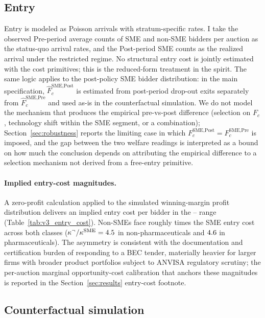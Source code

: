 \subsection{Entry}

Entry is modeled as Poisson arrivals with stratum-specific rates. I take the observed Pre-period average counts of SME and non-SME bidders per auction as the status-quo arrival rates, and the Post-period SME counts as the realized arrival under the restricted regime. No structural entry cost is jointly estimated with the cost primitives; this is the reduced-form treatment in the \citet{atheyseira2011} spirit. The same logic applies to the post-policy SME bidder distribution: in the main specification, $\hat F_c^{\text{SME,Post}}$ is estimated from post-period drop-out exits separately from $\hat F_c^{\text{SME,Pre}}$ and used as-is in the counterfactual simulation. We do not model the mechanism that produces the empirical pre-vs-post difference (selection on $F_c$, technology shift within the SME segment, or a combination); Section~\ref{sec:robustness} reports the limiting case in which $F_c^{\text{SME,Post}} = F_c^{\text{SME,Pre}}$ is imposed, and the gap between the two welfare readings is interpreted as a bound on how much the conclusion depends on attributing the empirical difference to a selection mechanism not derived from a free-entry primitive.

\paragraph{Implied entry-cost magnitudes.} A zero-profit calculation applied to the simulated winning-margin profit distribution delivers an implied entry cost per bidder in the \entryCostMin--\entryCostMax{} range (Table~\ref{tab:v3_entry_cost}). Non-SMEs face roughly \entryCostRatioNp{} times the SME entry cost across both classes ($\kappa^{\neg}/\kappa^{\text{SME}} = 4.5$ in non-pharmaceuticals and $4.6$ in pharmaceuticals). The asymmetry is consistent with the documentation and certification burden of responding to a BEC tender, materially heavier for larger firms with broader product portfolios subject to ANVISA regulatory scrutiny; the per-auction marginal opportunity-cost calibration that anchors these magnitudes is reported in the Section~\ref{sec:results} entry-cost footnote.

\subsection{Counterfactual simulation}

